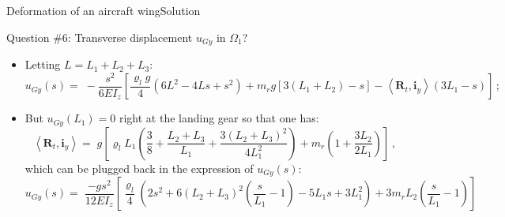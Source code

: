 \documentclass{beamer}
\newcommand{\uj}{u}
\newcommand{\yj}{y}
\newcommand{\zj}{z}
\renewcommand{\ij}{i}
\newcommand{\iv}{{\boldsymbol\ij}}
\newcommand{\medium}{\Omega}
\newcommand{\roi}{\varrho}
\newcommand{\Fresj}{R}
\newcommand{\Fres}{{\boldsymbol\Fresj}}
\newcommand{\scal}[1]{\left\langle{#1}\right\rangle}
\begin{document}
\begin{frame}{Deformation of an aircraft wing}{Solution}
\begin{overprint}
\vskip-20pt
\begin{exampleblock}{Question \#6: Transverse displacement $\uj_{G\yj}$ in $\medium_1$?}
\begin{itemize}
\item Letting $L=L_1+L_2+L_3$:
\begin{displaymath}
\!\!\!\!\!\!\!\!\!\!\!\!\!\uj_{G\yj}(s)=\scriptstyle\; -\frac{s^2}{6EI_\zj}\left[\frac{\roi_l g}{4}(6L^2-4Ls+s^2)+m_r g[3(L_1+L_2)-s]-\scal{\Fres_t,\iv_\yj}(3L_1-s)\right]\,;
\end{displaymath}
\item But $\uj_{G\yj}(L_1)=0$ right at the landing gear so that one has:
\begin{displaymath}
\scal{\Fres_t,\iv_\yj}= \scriptstyle\;g\left[\roi_l L_1\left(\frac{3}{8}+\frac{L_2+L_3}{L_1}+\frac{3(L_2+L_3)^2}{4L_1^2}\right)+m_r \left(1+\frac{3L_2}{2L_1}\right)\right]\,,
\end{displaymath}
which can be plugged back in the expression of $\uj_{G\yj}(s)$:
\begin{displaymath}
\!\!\!\!\!\!\!\!\!\!\!\!\!\uj_{G\yj}(s)=\scriptstyle\; \frac{-gs^2}{12EI_\zj}\left[\frac{\roi_l}{4}\left(2s^2+6(L_2+L_3)^2(\frac{s}{L_1}-1)-5L_1s+3L_1^2\right)+3m_rL_2(\frac{s}{L_1}-1)\right]
\end{displaymath}
\end{itemize}
\end{exampleblock}

\end{overprint}

\end{frame}
\end{document}
